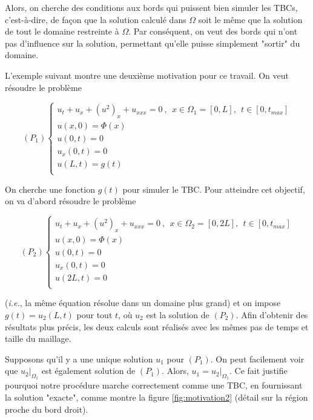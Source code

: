 \indent

\indent Alors, on cherche des conditions aux bords qui puissent bien simuler les TBCs, c'est-à-dire, de façon que la solution calculé dans $\Omega$ soit le même que la solution de tout le domaine restreinte à $\Omega$. Par conséquent, on veut des bords qui n'ont pas d'influence sur la solution, permettant qu'elle puisse simplement "sortir" du domaine.

\indent L'exemple suivant montre une deuxième motivation pour ce travail. On veut résoudre le problème 

\begin{equation*}
    (P_1) \begin{cases}
    u_t + u_x + (u^2)_x + u_{xxx} = 0 \ , \ \ x \in \Omega_1 = [0,L], \ \ t \in [0, t_{max}] \\
    u(x,0) = \Phi(x) \\
    u(0,t) = 0 \\
    u_x(0,t) = 0 \\
    u(L,t) = g(t)  \\ 
    \end{cases}
\end{equation*}

\indent On cherche une fonction  $g(t)$ pour simuler le TBC. Pour atteindre cet objectif, on va d'abord résoudre le problème

\begin{equation*}
    (P_2) \begin{cases}
    u_t + u_x + (u^2)_x + u_{xxx} = 0 \ , \ \ x \in \Omega_2 = [0,2L], \ \ t \in [0, t_{max}] \\
    u(x,0) = \Phi(x) \\
    u(0,t) = 0 \\
    u_x(0,t) = 0 \\
    u(2L,t) = 0  \\ 
    \end{cases}
\end{equation*}

\noindent (\emph{i.e.}, la même équation résolue dans un domaine plus grand) et on impose $g(t) = u_2(L,t)$ pour tout $t$, où $u_2$ est la solution de $(P_2)$. Afin d'obtenir des résultats plus précis, les deux calculs sont réalisés avec les mêmes pas de temps et taille du maillage.

\indent Supposons qu'il y a une unique solution $u_1$ pour $(P_1)$. On peut facilement voir que $u_2|_{\Omega_1}$ est également solution de $(P_1)$. Alors, $u_1 = u_2|_{\Omega_1}$. Ce fait justifie pourquoi notre procédure marche correctement comme une TBC, en fournissant la solution "exacte", comme montre la figure \ref{fig:motivation2}  (détail sur la région proche du bord droit).

